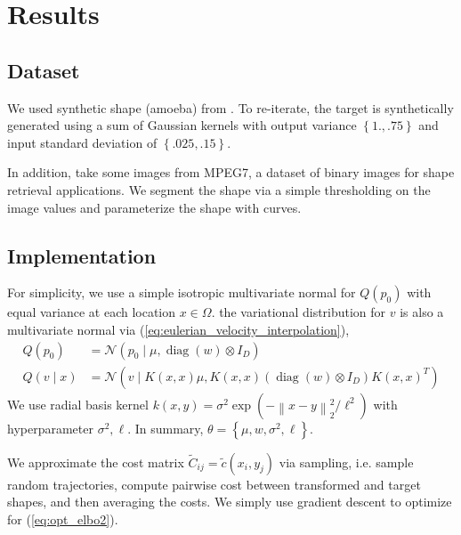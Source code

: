 \documentclass{6838publ}
\newcommand\sN{\ensuremath{\mathcal{N}}}
\newcommand{\norm}[1]{\left\lVert#1\right\rVert}
\DeclareMathOperator*{\diag}{diag} %
\newcommand\pc[1]{\ensuremath{\left\{ #1 \right\}}} %
\begin{document}
\section{Results}


\subsection{Dataset}

We used synthetic shape (amoeba) from \cite{feydyOptimalTransportDiffeomorphic2017a}. To re-iterate, the target is synthetically generated using a sum of Gaussian kernels with output variance $\pc{1., .75}$ and input standard deviation of $\pc{.025, .15}$.

In addition, take some images from MPEG7, a dataset of binary images for shape retrieval applications. We segment the shape via a simple thresholding on the image values and parameterize the shape with curves.

\subsection{Implementation}

For simplicity, we use a simple isotropic multivariate normal for $Q(p_0)$ with equal variance at each location $x\in\Omega$. the variational distribution for $v$ is also a multivariate normal via (\ref{eq:eulerian_velocity_interpolation}),
\begin{align}
    Q(p_0)
        &= \sN(p_0\mid \mu, \diag(w) \otimes I_D) \\
    Q(v\mid x)
        &= \sN(v\mid K(x,x)\mu, K(x,x) (\diag(w)\otimes I_D) K(x,x)^T)
\end{align}
We use radial basis kernel $k(x,y) = \sigma^2 \exp(-\norm{x-y}_2^2/\ell^2)$ with hyperparameter $\sigma^2,\ell$. In summary, $\theta = \pc{\mu,w,\sigma^2,\ell}$.

We approximate the cost matrix $\widetilde{C}_{ij}=\widetilde{c}(x_i,y_j)$ via sampling, i.e. sample random trajectories, compute pairwise cost between transformed and target shapes, and then averaging the costs. We simply use gradient descent to optimize for (\ref{eq:opt_elbo2}). 
\end{document}
